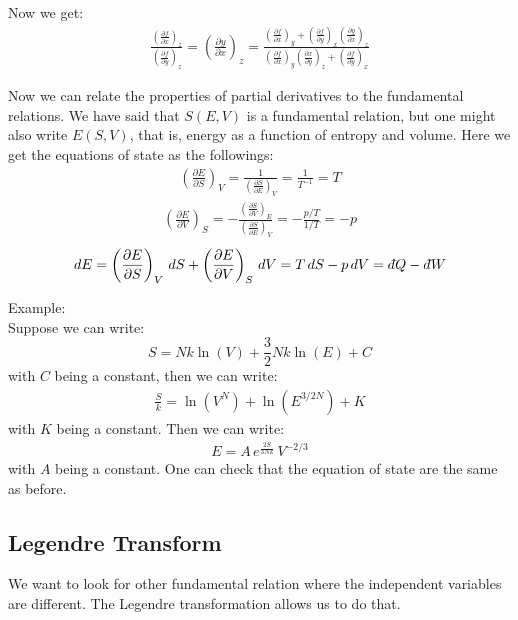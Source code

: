 \documentclass[11pt,oneside]{book}
\theoremstyle{break}
\theoremstyle{break}
\newcommand{\pd}{\partial}
\newcommand{\dbar}{d\hspace*{-0.08em}\bar{}\hspace*{0.1em}}
\newcommand{\example}{\color{green}Example: \color{black}}
\begin{document}
Now we get:
\begin{align*}
\frac{\left( \frac{\partial f}{\partial x}\right)_z}{\left(\frac{\partial f}{\partial y}\right)_z} = \left( \frac{\partial y}{\partial x}\right)_z = \frac{ \left( \frac{\partial f}{\partial x}\right)_y + \left( \frac{\partial f}{\partial y}\right)_x \left( \frac{\partial y}{\partial x}\right)_z }{\left( \frac{\partial f}{\partial x}\right)_y \left( \frac{\partial x}{\partial y}\right)_z + \left( \frac{\partial f}{\partial y}\right)_x }
\end{align*}


Now we can relate the properties of partial derivatives to the fundamental relations. We have said that $S(E,V)$ is a fundamental relation, but one might also write $E(S,V)$, that is, energy as a function of entropy and volume. Here we get the equations of state as the followings:
\begin{align*}
\left(\frac{\partial E}{\partial S} \right)_V = \frac{1}{\left(\frac{\pd S}{\pd E} \right)_V} = \frac{1}{T^{-1}}  = T
\end{align*}
\begin{align*}
\left(\frac{\pd E}{\pd V} \right)_S = - \frac{\left( \frac{\pd S}{\pd V}\right)_E}{\left( \frac{\pd S}{\pd E}\right)_V} = -\frac{p/T}{1/T} = -p 
\end{align*}
\begin{align*}
dE = \left(\frac{\pd E}{\pd S} \right)_V \, dS + \left( \frac{\pd E}{\pd V}\right)_S \, dV = T\, dS - p\, dV = \dbar Q - \dbar W
\end{align*}


\example\\
Suppose we can write: $$S = Nk\ln (V) + \frac{3}{2}N k \ln(E) + C$$
with $C$ being a constant, then we can write:
\begin{align*}
\frac{S}{k} = \ln(V^N) + \ln(E^{3/2 N}) + K
\end{align*}
with $K$ being a constant. Then we can write:
\begin{align*}
E = A\, e^{\frac{2S}{3Nk}}\, V^{-2/3}
\end{align*}
with $A$ being a constant. One can check that the equation of state are the same as before.\\

\newpage
\subsection{Legendre Transform}
We want to look for other fundamental relation where the independent variables are different. The Legendre transformation allows us to do that.\\
\end{document}
